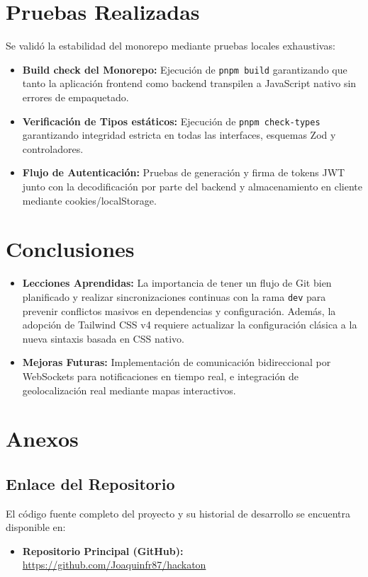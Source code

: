 \documentclass[11pt,a4paper]{article}
\begin{document}
\section{Pruebas Realizadas}
Se validó la estabilidad del monorepo mediante pruebas locales exhaustivas:
\begin{itemize}
    \item \textbf{Build check del Monorepo:} Ejecución de \texttt{pnpm build} garantizando que tanto la aplicación frontend como backend transpilen a JavaScript nativo sin errores de empaquetado.
    \item \textbf{Verificación de Tipos estáticos:} Ejecución de \texttt{pnpm check-types} garantizando integridad estricta en todas las interfaces, esquemas Zod y controladores.
    \item \textbf{Flujo de Autenticación:} Pruebas de generación y firma de tokens JWT junto con la decodificación por parte del backend y almacenamiento en cliente mediante cookies/localStorage.
\end{itemize}

\newpage
\section{Conclusiones}
\begin{itemize}
    \item \textbf{Lecciones Aprendidas:} La importancia de tener un flujo de Git bien planificado y realizar sincronizaciones continuas con la rama \texttt{dev} para prevenir conflictos masivos en dependencias y configuración. Además, la adopción de Tailwind CSS v4 requiere actualizar la configuración clásica a la nueva sintaxis basada en CSS nativo.
    \item \textbf{Mejoras Futuras:} Implementación de comunicación bidireccional por WebSockets para notificaciones en tiempo real, e integración de geolocalización real mediante mapas interactivos.
\end{itemize}

\section{Anexos}
\subsection{Enlace del Repositorio}
El código fuente completo del proyecto y su historial de desarrollo se encuentra disponible en:
\begin{itemize}
    \item \textbf{Repositorio Principal (GitHub):} \url{https://github.com/Joaquinfr87/hackaton}
\end{itemize}
\end{document}

